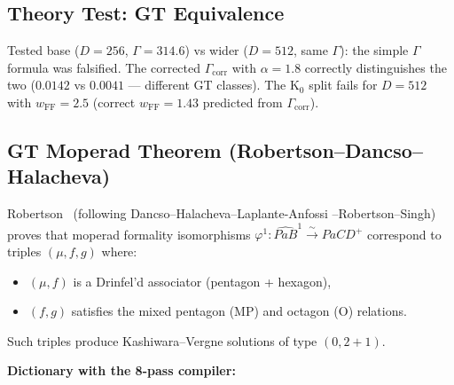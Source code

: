\documentclass[11pt]{amsart}
\begin{document}
\subsection{Theory Test: GT Equivalence}

Tested base ($D=256$, $\Gamma=314.6$) vs wider ($D=512$, same $\Gamma$):
the simple $\Gamma$ formula was falsified.
The corrected $\Gamma_\mathrm{corr}$ with $\alpha=1.8$ correctly
distinguishes the two ($0.0142$ vs $0.0041$ --- different GT classes).
The K$_0$ split fails for $D=512$ with $w_\mathrm{FF}=2.5$
(correct $w_\mathrm{FF}=1.43$ predicted from $\Gamma_\mathrm{corr}$).

\subsection{GT Moperad Theorem (Robertson--Dancso--Halacheva)}
\label{subsec:gtm}

Robertson~\cite{robertson2024} (following Dancso--Halacheva--Laplante-Anfossi
--Robertson--Singh) proves that moperad formality isomorphisms
$\varphi^1\colon \widehat{PaB}^1 \xrightarrow{\;\sim\;} PaCD^+$
correspond to triples $(\mu, f, g)$ where:
\begin{itemize}
  \item $(\mu, f)$ is a Drinfel'd associator (pentagon + hexagon),
  \item $(f, g)$ satisfies the mixed pentagon (MP) and octagon (O) relations.
\end{itemize}
Such triples produce Kashiwara--Vergne solutions of type $(0, 2{+}1)$.

\textbf{Dictionary with the 8-pass compiler:}
\end{document}
